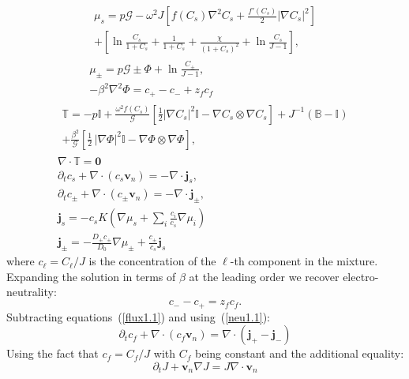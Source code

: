 \documentclass[12pt]{extarticle}
\begin{document}
\begin{gather}
\begin{aligned}
\mu_s = p \mathcal{G} - \omega^2 J \left[f(C_s)\nabla^2 C_s+\frac{f'(C_s)}{2}\left|\nabla C_s\right|^2\right]\\
 + \left[\ln \frac{C_s}{1+C_s} + \frac{1}{1+C_s}
 +\frac{\chi}{(1+C_s)^2} + \ln \frac{C_s}{J-1} \right], 
\end{aligned}\\[2.5mm]
\mu_\pm = p \mathcal{G} \pm \Phi + \ln \frac{C_\pm}{J-1} ,\\
-\beta^2 \nabla^2 \Phi = c_+-c_-+z_fc_f\, 
\end{gather}
\begin{gather}
\begin{aligned}
\mathbb{T}= -p \mathbb{I} +\frac{\omega^2f(C_s) }{\mathcal{G}} \left[\frac{1}{2} |\nabla C_s|^2\mathbb{I} - \nabla C_s \otimes \nabla C_s\right]+ J^{-1}\left(\mathbb{B}-\mathbb{I}\right)\\
+ \frac{\beta^2}{\mathcal{G}} \left[\frac{1}{2} \,|\nabla \Phi|^2\mathbb{I} -\nabla \Phi \otimes \nabla \Phi\right],
\end{aligned}\\
\nabla \cdot \mathbb{T}=\mathbf{0}\\
\partial_t c_s + \nabla \cdot(c_s \mathbf{v}_n)=- \nabla \cdot\mathbf{j}_s,\\
\partial_t c_\pm + \nabla \cdot(c_\pm \mathbf{v}_n)= -\nabla\cdot\mathbf{j}_\pm,\label{flux1.1}\\
\mathbf{j}_s =-c_sK  \left(\nabla \mu_s +\sum_i \frac{c_i}{c_s} \nabla \mu_i\right)\\
\mathbf{j}_\pm= - \frac{D_\pm c_\pm}{D_0}\nabla \mu_\pm + \frac{c_\pm}{c_s}\mathbf{j}_s
\end{gather}
where $c_\ell=C_\ell/J$ is the concentration of the $\ell$-th component in the mixture.
Expanding the solution in terms of $\beta$ at the leading order we recover electro-neutrality:
\begin{equation}
c_- - c_+=z_f c_f. \label{neu1.1}
\end{equation}
Subtracting equations~(\ref{flux1.1}) and using~(\ref{neu1.1}):
\begin{equation}
\partial_t c_f +\nabla \cdot(c_f \mathbf{v}_n)= \nabla\cdot(\mathbf{j}_+-\mathbf{j}_-)
\end{equation}
Using the fact that $c_f=C_f/J$ with $C_f$ being constant and the additional equality:
\begin{equation}
\partial_t J + \mathbf{v}_n \nabla J=J\nabla \cdot\mathbf{v}_n
\end{equation}
\end{document}
